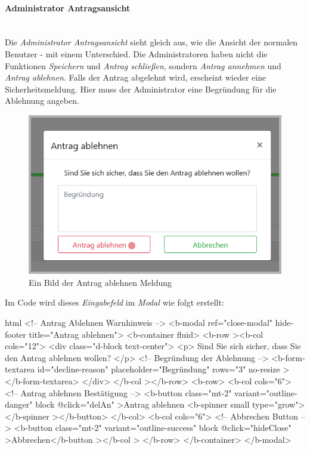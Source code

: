 \paragraph{Administrator Antragsansicht}
~\\
Die \textit{Administrator Antragsansicht} sieht gleich aus, wie die Ansicht der normalen Benutzer - mit einem Unterschied. Die Administratoren haben nicht die Funktionen \textit{Speichern} und \textit{Antrag schließen}, sondern \textit{Antrag annehmen} und \textit{Antrag ablehnen}. Falls der Antrag abgelehnt wird, erscheint wieder eine Sicherheitsmeldung. Hier muss der Administrator eine Begründung für die Ablehnung angeben. 
\begin{figure}[H]
	\centering
	\includegraphics[width=0.6\linewidth]{images/ldehner_implementierung/admin_antrag_schiessen}
	\caption[Antrag ablehnen Warnung]{Ein Bild der Antrag ablehnen Meldung}
	\label{fig:adminclose}
\end{figure}
Im Code wird dieses \textit{Eingabefeld} im \textit{Modal} wie folgt erstellt:
\begin{code}{html}
	<!-- Antrag Ablehnen Warnhinweis -->
    <b-modal ref="close-modal" hide-footer title="Antrag ablehnen">
      <b-container fluid>
        <b-row
          ><b-col cols="12">
            <div class="d-block text-center">
              <p>
                Sind Sie sich sicher, dass Sie den Antrag ablehnen wollen?
              </p>
              <!-- Begründung der Ablehnung -->
              <b-form-textarea
                id="decline-reason"
                placeholder="Begründung"
                rows="3"
                no-resize
              ></b-form-textarea>
            </div> </b-col
        ></b-row>
        <b-row>
          <b-col cols="6">
            <!-- Antrag ablehnen Bestätigung -->
            <b-button class="mt-2" variant="outline-danger" block @click="delAn"
              >Antrag ablehnen <b-spinner small type="grow"></b-spinner
            ></b-button>
          </b-col>
          <b-col cols="6">
            <!-- Abbrechen Button -->
            <b-button
              class="mt-2"
              variant="outline-success"
              block
              @click="hideClose"
              >Abbrechen</b-button
            ></b-col
          >
        </b-row>
      </b-container>
    </b-modal>
\end{code}
	\label{list:badgebsp} ~\\
